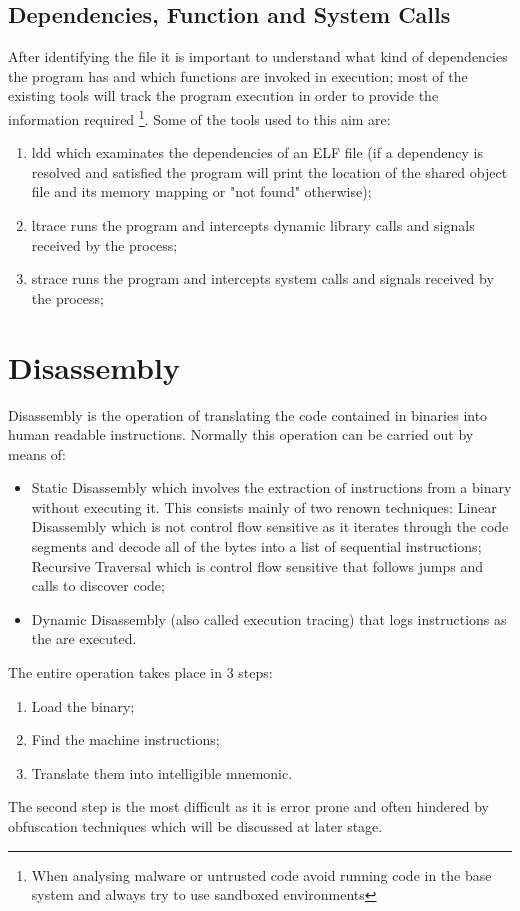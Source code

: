 \subsection{Dependencies, Function and System Calls}
After identifying the file it is important to understand what kind of dependencies the program has and which functions
are invoked in execution; most of the existing tools will track the program execution in order to provide the
information required \footnote{When analysing malware or untrusted code avoid running code in the base system and always
try to use sandboxed environments}. Some of the tools used to this aim are:
\begin{enumerate}
    \item {\ttfamily ldd} which examinates the dependencies of an ELF file (if a dependency is resolved and satisfied
        the program will print the location of the shared object file and its memory mapping or "{\ttfamily not found}"
        otherwise);
    \item {\ttfamily ltrace} runs the program and intercepts dynamic library calls and signals received by the process;
    \item {\ttfamily strace} runs the program and intercepts system calls and signals received by the process;
\end{enumerate}



\section{Disassembly}
Disassembly is the operation of translating the code contained in binaries into human readable instructions. Normally
this operation can be carried out by means of:
\begin{itemize}
    \item Static Disassembly which involves the extraction of instructions from a binary without executing it. This
        consists mainly of two renown techniques:
        \subitem Linear Disassembly which is not control flow sensitive as it iterates through the code segments and
        decode all of the bytes into a list of sequential instructions;
        \subitem Recursive Traversal which is control flow sensitive that follows jumps and calls to discover code;
    \item Dynamic Disassembly (also called execution tracing) that logs instructions as the are executed.
\end{itemize}
The entire operation takes place in 3 steps:
\begin{enumerate}
    \item Load the binary;
    \item Find the machine instructions;
    \item Translate them into intelligible mnemonic.
\end{enumerate}
The second step is the most difficult as it is error prone and often hindered by obfuscation techniques which will be
discussed at later stage.


